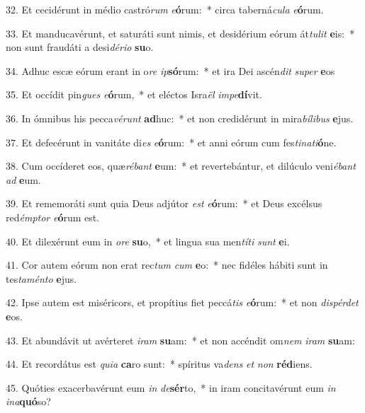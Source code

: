 32. Et cecidérunt in médio castró\textit{rum} \textit{e}\textbf{ó}rum:~*  circa taberná\textit{cu}\textit{la} \textit{e}\textbf{ó}rum.\

33. Et manducavérunt, et saturáti sunt nimis, et desidérium eórum át\textit{tu}\textit{lit} \textbf{e}is:~*  non sunt fraudáti a desi\textit{dé}\textit{ri}\textit{o} \textbf{su}o.\

34. Adhuc escæ eórum erant in o\textit{re} \textit{ip}\textbf{só}rum:~*  et ira Dei ascén\textit{dit} \textit{su}\textit{per} \textbf{e}os\

35. Et occídit pin\textit{gues} \textit{e}\textbf{ó}rum,~*  et eléctos Isra\textit{ël} \textit{im}\textit{pe}\textbf{dí}vit.\

36. In ómnibus his pecca\textit{vé}\textit{runt} \textbf{ad}huc:~*  et non credidérunt in mira\textit{bí}\textit{li}\textit{bus} \textbf{e}jus.\

37. Et defecérunt in vanitáte di\textit{es} \textit{e}\textbf{ó}rum:~*  et anni eórum cum fes\textit{ti}\textit{na}\textit{ti}\textbf{ó}ne.\

38. Cum occíderet eos, quæ\textit{ré}\textit{bant} \textbf{e}um:~*  et revertebántur, et dilúculo veni\textit{é}\textit{bant} \textit{ad} \textbf{e}um.\

39. Et rememoráti sunt quia Deus adjútor \textit{est} \textit{e}\textbf{ó}rum:~*  et Deus excélsus red\textit{émp}\textit{tor} \textit{e}\textbf{ó}rum est.\

40. Et dilexérunt eum in \textit{o}\textit{re} \textbf{su}o,~*  et lingua sua men\textit{tí}\textit{ti} \textit{sunt} \textbf{e}i.\

41. Cor autem eórum non erat rec\textit{tum} \textit{cum} \textbf{e}o:~*  nec fidéles hábiti sunt in tes\textit{ta}\textit{mén}\textit{to} \textbf{e}jus.\

42. Ipse autem est miséricors, et propítius fiet peccá\textit{tis} \textit{e}\textbf{ó}rum:~*  et non \textit{dis}\textit{pér}\textit{det} \textbf{e}os.\

43. Et abundávit ut avérteret \textit{i}\textit{ram} \textbf{su}am:~*  et non accéndit om\textit{nem} \textit{i}\textit{ram} \textbf{su}am:\

44. Et recordátus est \textit{qui}\textit{a} \textbf{ca}ro sunt:~*  spíritus va\textit{dens} \textit{et} \textit{non} \textbf{réd}iens.\

45. Quóties exacerbavérunt eum \textit{in} \textit{de}\textbf{sér}to,~*  in iram concitavérunt eum \textit{in} \textit{in}\textit{a}\textbf{quó}so?\

